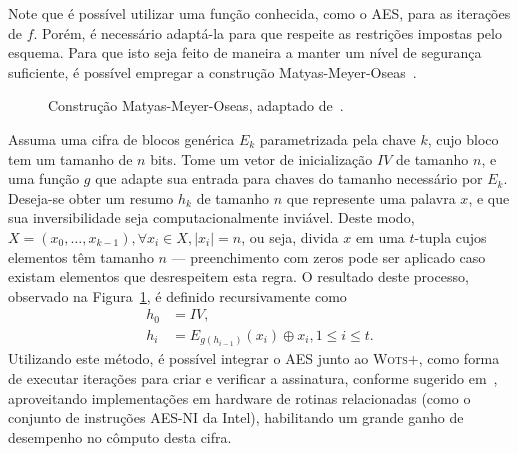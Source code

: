 \documentclass[12pt]{report}
\newcommand{\length}[1]{\vert #1 \vert}
\begin{document}
Note que é possível utilizar uma função conhecida, como o AES, para as
iterações de $f$. Porém, é necessário adaptá-la para que respeite as
restrições impostas pelo esquema. Para que isto seja feito de maneira
a manter um nível de segurança suficiente, é possível empregar a construção
Matyas-Meyer-Oseas~\cite[9.41]{Menezes:1996:HAC:548089}.

\begin{figure}[ht]
  \centering
  \caption{Construção Matyas-Meyer-Oseas,
    adaptado de~\cite{TikZ:for:Cryptographers}.}
  \label{fig:6}
\end{figure}

Assuma uma cifra de blocos genérica $E_{k}$ parametrizada pela chave $k$, cujo
bloco tem um tamanho de $n$ bits. Tome um vetor de inicialização $IV$ de
tamanho $n$, e uma função $g$ que adapte sua entrada para chaves do tamanho
necessário por $E_{k}$. Deseja-se obter um resumo $h_k$ de tamanho $n$ que
represente uma palavra $x$, e que sua inversibilidade seja computacionalmente
inviável. Deste modo, $X = (x_0, \dots, x_{k - 1}), \forall x_i \in X,
\length{x_i} = n$, ou seja, divida $x$ em uma $t$-tupla cujos elementos têm
tamanho $n$ --- preenchimento com zeros pode ser aplicado caso existam
elementos que desrespeitem esta regra. O resultado deste processo, observado
na Figura~\ref{fig:6}, é definido recursivamente como
\begin{equation}
    \begin{split}
        h_0 &= IV, \\
        h_i &= E_{g(h_{i-1})}(x_i) \oplus x_i, 1 \leq i \leq t.
    \end{split}
\end{equation}
Utilizando este método, é possível integrar o AES junto ao \textsc{Wots+}, como
forma de executar iterações para criar e verificar a assinatura, conforme
sugerido em~\cite[4.1]{Hlsing2013}, aproveitando implementações em
hardware de rotinas relacionadas (como o conjunto de instruções AES-NI da
Intel), habilitando um grande ganho de desempenho no cômputo desta cifra.
\end{document}
